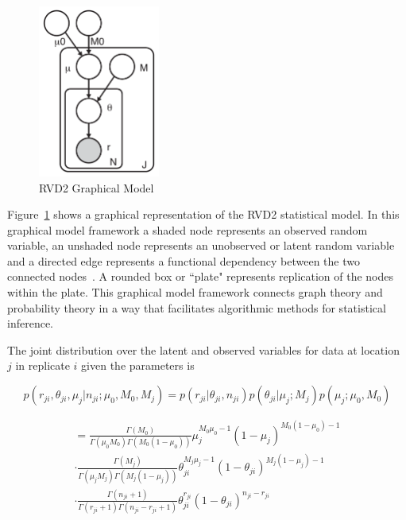 \documentclass[11pt,reqno]{amsart}
\begin{document}
\begin{figure}[h]
\begin{center}
\includegraphics[width=40mm]{pdf_figs/RVD2_model.pdf}
\caption{RVD2 Graphical Model}
\label{fig:graphical_model}
\end{center}
\end{figure}

Figure~\ref{fig:graphical_model} shows a graphical representation of the RVD2 statistical model. In this graphical model framework a shaded node represents an observed random variable, an unshaded node represents an unobserved or latent random variable and a directed edge represents a functional dependency between the two connected nodes~\cite{}. A rounded box or ``plate" represents replication of the nodes within the plate. This graphical model framework connects graph theory and probability theory in a way that facilitates algorithmic methods for statistical inference.

The joint distribution over the latent and observed variables for data at location $j$ in replicate $i$ given the parameters is

\begin{equation}\label{eqn:jointpdf}
p \left( r_{ji}, \theta_{ji}, \mu_j | n_{ji}; \mu_0, M_0, M_j \right) = p \left( r_{ji} | \theta_{ji}, n_{ji} \right) p\left( \theta_{ji} | \mu_j; M_j \right) p\left( \mu_j; \mu_0, M_0 \right)
\end{equation}

\begin{gather}
= \frac{ \Gamma(M_0) } { \Gamma(\mu_0 M_0) \Gamma(M_0 (1-\mu_0)) } \mu_j^{M_0\mu_0 -1} (1 - \mu_j)^{M_0 ( 1 - \mu_0) - 1} \\
\cdot \frac{ \Gamma(M_j) } { \Gamma(\mu_j M_j) \Gamma(M_j (1-\mu_j)) } \theta_{ji}^{M_j\mu_j -1} (1 - \theta_{ji})^{M_j ( 1 - \mu_j) - 1} \\
\cdot \frac{ \Gamma(n_{ji}+1) } { \Gamma(r_{ji}+1) \Gamma( n_{ji} - r_{ji} + 1 ) } \theta_{ji}^{r_{ji}} (1 - \theta_{ji})^{n_{ji} - r_{ji}}
\end{gather}
\end{document}
